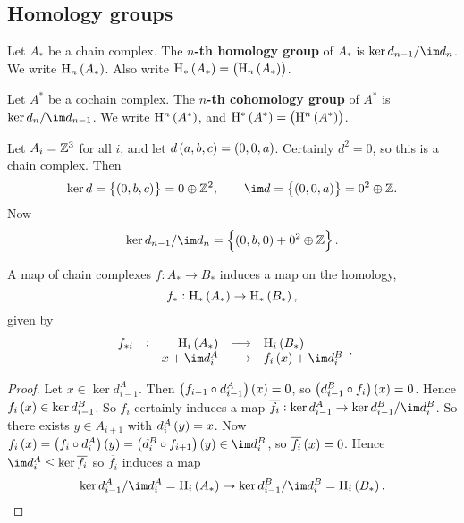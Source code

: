 \subsection{Homology groups}

\begin{definition}
Let $ A_* $ be a chain complex. The \textbf{$ n $-th homology group} of $ A_* $ is $ \ker d_{n - 1} / \im d_n $. We write $ \H_n\br{A_*} $. Also write $ \H_*\br{A_*} = \br{\H_n\br{A_*}} $.
\end{definition}

\begin{definition}
Let $ A^* $ be a cochain complex. The \textbf{$ n $-th cohomology group} of $ A^* $ is $ \ker d_n / \im d_{n - 1} $. We write $ \H^n\br{A^*} $, and $ \H^*\br{A^*} = \br{\H^n\br{A^*}} $.
\end{definition}

\begin{example*}
Let $ A_i = \mathbb{Z}^3 $ for all $ i $, and let $ d\br{a, b, c} = \br{0, 0, a} $. Certainly $ d^2 = 0 $, so this is a chain complex. Then
$$ \ker d = \cbr{\br{0, b, c}} = 0 \oplus \ZZ^2, \qquad \im d = \cbr{\br{0, 0, a}} = 0^2 \oplus \ZZ. $$
Now
$$ \ker d_{n - 1} / \im d_n = \cbr{\br{0, b, 0} + 0^2 \oplus \ZZ}. $$
\end{example*}

\begin{proposition}
A map of chain complexes $ f : A_* \to B_* $ induces a map on the homology,
$$ f_* : \H_*\br{A_*} \to \H_*\br{B_*}, $$
given by
$$ \function[f_{*i}]{\H_i\br{A_*}}{\H_i\br{B_*}}{x + \im d_i^A}{f_i\br{x} + \im d_i^B}. $$
\end{proposition}

\begin{proof}
Let $ x \in \ker d_{i - 1}^A $. Then $ \br{f_{i - 1} \circ d_{i - 1}^A}\br{x} = 0 $, so $ \br{d_{i - 1}^B \circ f_i}\br{x} = 0 $. Hence $ f_i\br{x} \in \ker d_{i - 1}^B $. So $ f_i $ certainly induces a map $ \overline{f_i} : \ker d_{i - 1}^A \to \ker d_{i - 1}^B / \im d_i^B $. So there exists $ y \in A_{i + 1} $ with $ d_i^A\br{y} = x $. Now $ f_i\br{x} = \br{f_i \circ d_i^A}\br{y} = \br{d_i^B \circ f_{i + 1}}\br{y} \in \im d_i^B $, so $ \overline{f_i}\br{x} = 0 $. Hence $ \im d_i^A \le \ker \overline{f_i} $ so $ \overline{f_i} $ induces a map
$$ \ker d_{i - 1}^A / \im d_i^A = \H_i\br{A_*} \to \ker d_{i - 1}^B / \im d_i^B = \H_i\br{B_*}. $$
\end{proof}

\pagebreak

